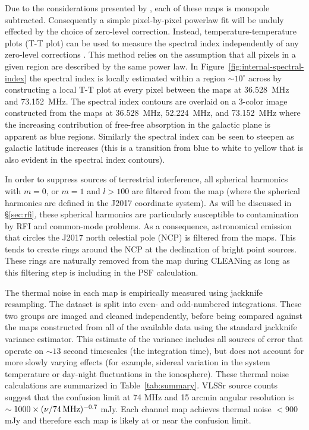 \documentclass[twocolumn]{aastex61}
\begin{document}
Due to the considerations presented by \citet{2016ApJ...826..116V}, each of these maps is monopole
subtracted. Consequently a simple pixel-by-pixel powerlaw fit will be unduly effected by the choice
of zero-level correction. Instead, temperature-temperature plots (T-T plot) can be used to measure
the spectral index independently of any zero-level corrections \citep{1962MNRAS.124..297T}. This
method relies on the assumption that all pixels in a given region are described by the same power
law. In Figure~\ref{fig:internal-spectral-index} the spectral index is locally estimated within a
region $\sim10^\circ$ across by constructing a local T-T plot at every pixel between the maps at
36.528~MHz and 73.152~MHz. The spectral index contours are overlaid on a 3-color image constructed
from the maps at 36.528~MHz, 52.224~MHz, and 73.152~MHz where the increasing contribution of
free-free absorption in the galactic plane is apparent as blue regions. Similarly the spectral index
can be seen to steepen as galactic latitude increases (this is a transition from blue to white to
yellow that is also evident in the spectral index contours).

In order to suppress sources of terrestrial interference, all spherical harmonics with $m=0$, or
$m=1$ and $l>100$ are filtered from the map (where the spherical harmonics are defined in the J2017
coordinate system). As will be discussed in \S\ref{sec:rfi}, these spherical harmonics are
particularly susceptible to contamination by RFI and common-mode problems. As a consequence,
astronomical emission that circles the J2017 north celestial pole (NCP) is filtered from the maps.
This tends to create rings around the NCP at the declination of bright point sources. These rings
are naturally removed from the map during CLEANing as long as this filtering step is including in
the PSF calculation.

The thermal noise in each map is empirically measured using jackknife resampling. The dataset is
split into even- and odd-numbered integrations. These two groups are imaged and cleaned
independently, before being compared against the maps constructed from all of the available data
using the standard jackknife variance estimator. This estimate of the variance includes all sources
of error that operate on $\sim13$ second timescales (the integration time), but does not account for
more slowly varying effects (for example, sidereal variation in the system temperature or day-night
fluctuations in the ionosphere). These thermal noise calculations are summarized in
Table~\ref{tab:summary}.  VLSSr source counts \citep{2014MNRAS.440..327L} suggest that the confusion
limit at 74 MHz and 15 arcmin angular resolution is $\sim 1000\times(\nu/74\,{\rm MHz})^{-0.7}$ mJy.
Each channel map achieves thermal noise $<900$ mJy and therefore each map is likely at or near the
confusion limit.
\end{document}
